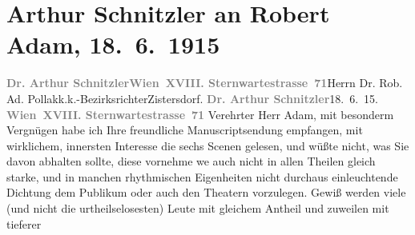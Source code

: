 

         
         \renewcommand{\erwaehntePersonen}{Personen: Robert Adam}
         \renewcommand{\erwaehnteOrte}{Orte: Sternwartestraße, Wien, Zistersdorf}
         \renewcommand{\erwaehnteWerke}{Werke: Der Fremde}
               \section[Arthur Schnitzler an Robert Adam, 18. 6. 1915]{ Arthur Schnitzler an Robert Adam, 18. 6. 1915}\nopagebreak{}\rehead{ }\begin{ledgroupsized}[t]{13cm}\normalsize\beginnumbering{} \toendnotes[C]{\smallbreak\pagebreak[2]} 
\toendnotes[C]{\smallbreak}\pstart{}{\pb}\textcolor{gray}{\textbf{Dr. Arthur Schnitzler}}\pend{}\pstart{}\textcolor{gray}{\textbf{Wien XVIII. Sternwartestrasse 71}}\pend{}{\bigskip}\pstart{}{\pb}Herrn Dr. Rob. Ad. Pollak\pend{}\pstart{}k.k.-Bezirksrichter\pend{}\pstart{}Zistersdorf.\pend{}{\bigskip}\pstart
           \noindent{}{\pb}\textcolor{gray}{\textbf{Dr. Arthur Schnitzler}}\hfill 18. 6. 15.\pend
           \pstart
           \textcolor{gray}{\textbf{Wien XVIII. Sternwartestrasse 71}}\pend
           \pstart{}Verehrter Herr Adam,\pend\pstart
           mit besonderm Vergnügen habe ich Ihre freundliche Manuscriptsendung empfangen, mit wirklichem, innersten
               Interesse die sechs Scenen gelesen, und wüßte nicht, was Sie davon abhalten sollte,
               diese vornehme we{\geminationn} auch nicht in allen Theilen gleich
               starke, und in manchen rhythmischen Eigenheiten nicht durchaus einleuchtende Dichtung
               dem Publikum oder auch den Theatern vorzulegen. Gewiß werden viele (und nicht die
               urtheilselosesten) {\pb}\introOben{}Leute\introOben{} mit gleichem Antheil und zuweilen mit tieferer

\end{ledgroupsized}
